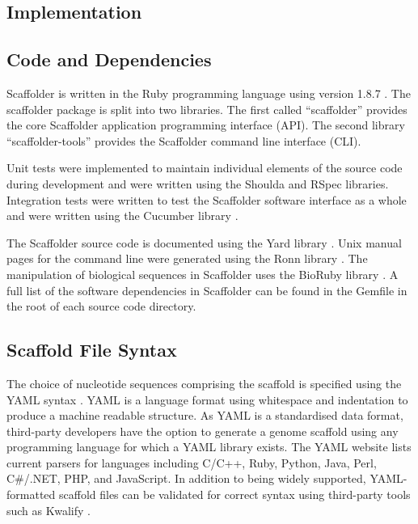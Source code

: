 \documentclass[10pt]{bmc_article}
\newenvironment{bmcformat}{\begin{raggedright}\baselineskip20pt\sloppy\setboolean{publ}{false}}{\end{raggedright}\baselineskip20pt\sloppy}
\begin{document}
\begin{bmcformat}
\clearpage

\section*{Implementation} %

\subsection*{Code and Dependencies} %

Scaffolder is written in the Ruby programming language using version 1.8.7
\cite{ruby-lang}. The scaffolder package is split into two libraries. The
first called ``scaffolder'' provides the core Scaffolder application
programming interface (API). The second library ``scaffolder-tools'' provides
the Scaffolder command line interface (CLI). \pb

Unit tests were implemented to maintain individual elements of the source code
during development and were written using the Shoulda and RSpec \cite{rspec}
libraries. Integration tests were written to test the Scaffolder software
interface as a whole and were written using the Cucumber library \cite{rspec}.
\pb

The Scaffolder source code is documented using the Yard library \cite{yard}.
Unix manual pages for the command line were generated using the Ronn library
\cite{ronn}. The manipulation of biological sequences in Scaffolder uses the
BioRuby library \cite{goto2010}. A full list of the software dependencies in
Scaffolder can be found in the Gemfile in the root of each source code
directory. \pb

\subsection*{Scaffold File Syntax} %

The choice of nucleotide sequences comprising the scaffold is specified using
the YAML syntax \cite{yaml}. YAML is a language format using whitespace and
indentation to produce a machine readable structure. As YAML is a standardised
data format, third-party developers have the option to generate a genome
scaffold using any programming language for which a YAML library exists. The
YAML website lists current parsers for languages including C/C++, Ruby, Python,
Java, Perl, C\#/.NET, PHP, and JavaScript. In addition to being widely
supported, YAML-formatted scaffold files can be validated for correct syntax
using third-party tools such as Kwalify \cite{kwalify}. \pb


\end{bmcformat}
\end{document}
